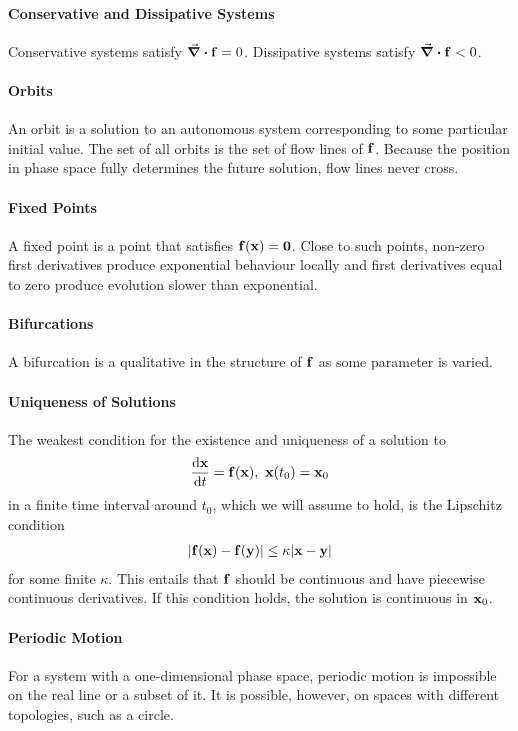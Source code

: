 \paragraph{Conservative and Dissipative Systems}
Conservative systems satisfy $\div{\vb{f}} = 0$. Dissipative systems satisfy $\div{\vb{f}} < 0$.

\paragraph{Orbits}
An orbit is a solution to an autonomous system corresponding to some particular initial value. The set of all orbits is the set of flow lines of $\vb{f}$. Because the position in phase space fully determines the future solution, flow lines never cross.

\paragraph{Fixed Points}
A fixed point is a point that satisfies $\vb{f}(\vb{x}) = \vb{0}$. Close to such points, non-zero first derivatives produce exponential behaviour locally and first derivatives equal to zero produce evolution slower than exponential.

\paragraph{Bifurcations}
A bifurcation is a qualitative in the structure of $\vb{f}$ as some parameter is varied.

\paragraph{Uniqueness of Solutions}
The weakest condition for the existence and uniqueness of a solution to
\begin{align*}
	\dv{\vb{x}}{t} = \vb{f}(\vb{x}),\ \vb{x}(t_{0}) = \vb{x}_{0}
\end{align*}
in a finite time interval around $t_{0}$, which we will assume to hold, is the Lipschitz condition
\begin{align*}
	\abs{\vb{f}(\vb{x}) - \vb{f}(\vb{y})} \leq \kappa\abs{\vb{x} - \vb{y}}
\end{align*}
for some finite $\kappa$. This entails that $\vb{f}$ should be continuous and have piecewise continuous derivatives. If this condition holds, the solution is continuous in $\vb{x}_{0}$.

\paragraph{Periodic Motion}
For a system with a one-dimensional phase space, periodic motion is impossible on the real line or a subset of it. It is possible, however, on spaces with different topologies, such as a circle.

